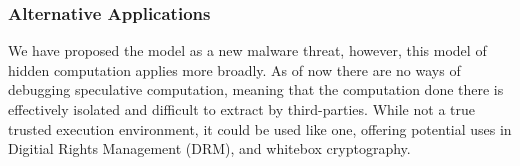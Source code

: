 \subsubsection{Alternative Applications}
We have proposed the \speculake model as a new malware threat, however, this
model of hidden computation applies more broadly. As of now there are no ways of
debugging speculative computation, meaning that the computation done there is
effectively isolated and difficult to extract by third-parties. While not a true
trusted execution environment, it could be used like one, offering potential
uses in Digitial Rights Management (DRM), and whitebox cryptography.



